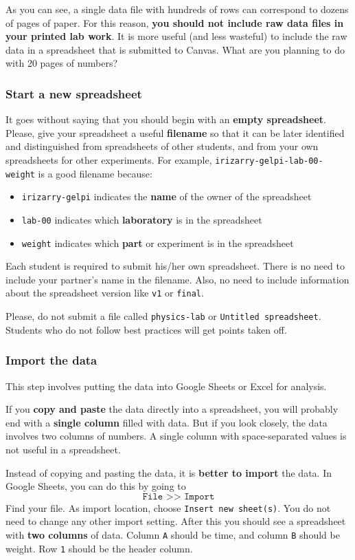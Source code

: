 As you can see, a single data file with hundreds of rows can correspond to dozens of pages of paper. For this reason, \textbf{you should not include raw data files in your printed lab work}. It is more useful (and less wasteful) to include the raw data in a spreadsheet that is submitted to Canvas. What are you planning to do with 20 pages of numbers?
%
\subsubsection{Start a new spreadsheet}
%
It goes without saying that you should begin with an \textbf{empty spreadsheet}. Please, give your spreadsheet a useful \textbf{filename} so that it can be later identified and distinguished from spreadsheets of other students, and from your own spreadsheets for other experiments. For example, \texttt{irizarry-gelpi-lab-00-weight} is a good filename because:
\begin{itemize}
    \item \texttt{irizarry-gelpi} indicates the \textbf{name} of the owner of the spreadsheet
    \item \texttt{lab-00} indicates which \textbf{laboratory} is in the spreadsheet
    \item \texttt{weight} indicates which \textbf{part} or experiment is in the spreadsheet
\end{itemize}
Each student is required to submit his/her own spreadsheet. There is no need to include your partner's name in the filename. Also, no need to include information about the spreadsheet version like \texttt{v1} or \texttt{final}.

Please, do not submit a file called \texttt{physics-lab} or \texttt{Untitled spreadsheet}. Students who do not follow best practices will get points taken off.
%
\subsubsection{Import the data}
%
This step involves putting the data into Google Sheets or Excel for analysis.

If you \textbf{copy and paste} the data directly into a spreadsheet, you will probably end with a \textbf{single column} filled with data. But if you look closely, the data involves two columns of numbers. A single column with space-separated values is not useful in a spreadsheet.

Instead of copying and pasting the data, it is \textbf{better to import} the data. In Google Sheets, you can do this by going to
\begin{equation}
    \texttt{File >> Import}
\end{equation}
Find your file. As import location, choose \texttt{Insert new sheet(s)}. You do not need to change any other import setting. After this you should see a spreadsheet with \textbf{two columns} of data. Column \texttt{A} should be time, and column \texttt{B} should be weight. Row \texttt{1} should be the header column.

